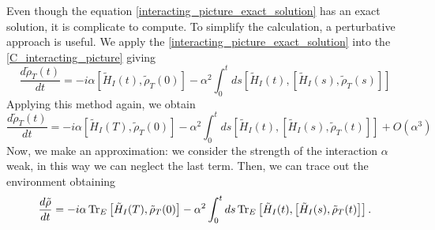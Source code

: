 Even though the equation \eqref{interacting_picture_exact_solution} has an exact solution, it is complicate to compute. To simplify the calculation, a perturbative approach is useful. We apply the \eqref{interacting_picture_exact_solution} into the \eqref{C_interacting_picture} giving
\begin{equation}
    \frac{d\tilde\rho_T(t)}{dt}= -i\alpha\left[\tilde H_I(t),\tilde\rho_T(0)\right] -\alpha^2 \int_{0}^{t}ds\left[\tilde H_I(t),\left[\tilde H_I(s),\tilde\rho_T(s)\right]\right]
\end{equation}
Applying this method again, we obtain
\begin{equation}
    \frac{d\tilde\rho_T(t)}{dt}= -i\alpha\left[\tilde H_I(T),\tilde\rho_T(0)\right] -\alpha^2 \int_{0}^{t}ds\left[\tilde H_I(t),\left[\tilde H_I(s),\tilde\rho_T(t)\right]\right] + O(\alpha^3)
\end{equation}
Now, we make an approximation: we consider the strength of the interaction $\alpha$ weak, in this way we can neglect the last term.
Then, we can trace out the environment obtaining
\begin{equation}\label{trace_C_interacting_picture}
    \frac{d\tilde\rho}{dt} = -i\alpha\operatorname{Tr}_E\left[\tilde H_I(T),\tilde\rho_T(0)\right] -\alpha^2 \int_{0}^{t}ds \operatorname{Tr}_E\left[\tilde H_I(t),\left[\tilde H_I(s),\tilde\rho_T(t)\right]\right].
\end{equation}

